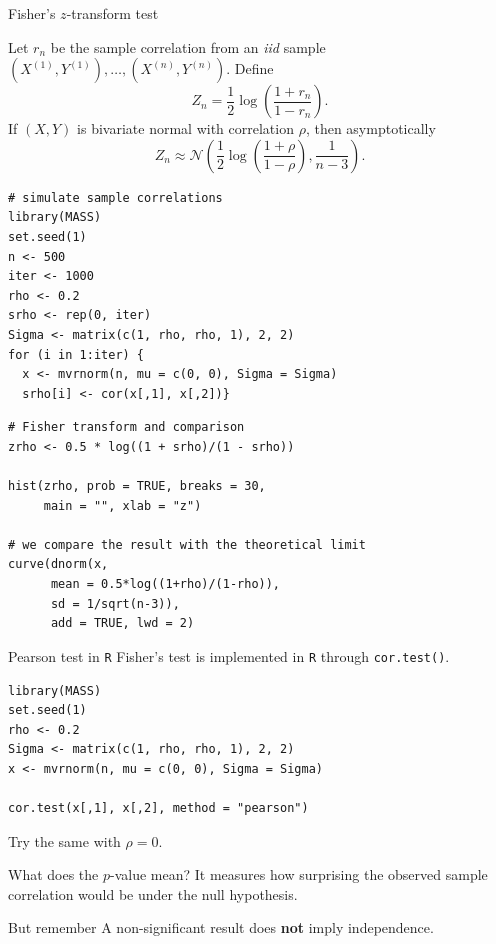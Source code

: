 \documentclass[dvipsnames,aspectratio=169,handout]{beamer}
\begin{document}
\begin{frame}[fragile]{Fisher's $z$-transform test}

Let $r_n$ be the sample correlation from an \emph{iid} sample
$
(X^{(1)},Y^{(1)}),\ldots,(X^{(n)},Y^{(n)}).
$
Define
\[
Z_n=\frac12\log\left(\frac{1+r_n}{1-r_n}\right).
\]
If $(X,Y)$ is \alert{bivariate normal} with correlation $\rho$, then asymptotically
\[
Z_n\approx \mathcal N\!\left(\frac12\log\left(\frac{1+\rho}{1-\rho}\right),\frac{1}{n-3}\right).
\]

\begin{minipage}{7.6cm}
\begin{lstlisting}
# simulate sample correlations
library(MASS)
set.seed(1)
n <- 500
iter <- 1000
rho <- 0.2
srho <- rep(0, iter)
Sigma <- matrix(c(1, rho, rho, 1), 2, 2)
for (i in 1:iter) {
  x <- mvrnorm(n, mu = c(0, 0), Sigma = Sigma)
  srho[i] <- cor(x[,1], x[,2])}
\end{lstlisting}
\end{minipage}\;\;
\begin{minipage}{7.6cm}
\begin{lstlisting}
# Fisher transform and comparison
zrho <- 0.5 * log((1 + srho)/(1 - srho))

hist(zrho, prob = TRUE, breaks = 30,
     main = "", xlab = "z")

# we compare the result with the theoretical limit     
curve(dnorm(x,
      mean = 0.5*log((1+rho)/(1-rho)),
      sd = 1/sqrt(n-3)),
      add = TRUE, lwd = 2)
\end{lstlisting}
 
\end{minipage}

\end{frame}

\begin{frame}[fragile]{Pearson test in \texttt{R}}
Fisher's test is implemented in \texttt{R} through \texttt{cor.test()}.

\begin{lstlisting}
library(MASS)
set.seed(1)
rho <- 0.2
Sigma <- matrix(c(1, rho, rho, 1), 2, 2)
x <- mvrnorm(n, mu = c(0, 0), Sigma = Sigma)

cor.test(x[,1], x[,2], method = "pearson")
\end{lstlisting}
Try the same with $\rho=0$.\\
\begin{alertblock}{What does the $p$-value mean?}
It measures how surprising the observed sample correlation would be
under the null hypothesis.
\end{alertblock}

\begin{block}{But remember}
A non-significant result does \textbf{not} imply independence.
\end{block}
\end{frame}
\end{document}
